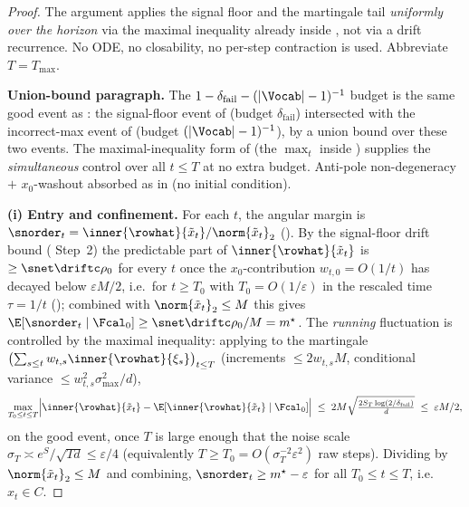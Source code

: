 \begin{proof}
The argument applies the signal floor and the martingale tail
\emph{uniformly over the horizon} via the maximal inequality already inside
, not via a drift recurrence. No ODE, no closability, no
per-step contraction is used. Abbreviate $T=T_{\max}$.

\smallskip\noindent\textbf{Union-bound paragraph.} The
$1-\delta_{\mathrm{fail}}-(|\Vocab|-1)^{-1}$ budget is the same good event
as : the signal-floor event of 
(budget $\delta_{\mathrm{fail}}$) intersected with the incorrect-max event
of  (budget $(|\Vocab|-1)^{-1}$), by a union bound
over these two events. The maximal-inequality form of  (the
$\max_t$ inside ) supplies the \emph{simultaneous}
control over all $t\le T$ at no extra budget. Anti-pole non-degeneracy
$+$ $x_0$-washout absorbed as in  (no initial condition).

\smallskip\noindent\textbf{(i) Entry and confinement.} For each $t$, the
angular margin is $\snorder_t=\inner{\rowhat}{\tilde x_t}/\norm{\tilde x_t}_2$
(). By the signal-floor drift
bound ( Step~2) the predictable part of
$\inner{\rowhat}{\tilde x_t}$ is $\ge\snet\driftc\rho_0$ for every $t$ once
the $x_0$-contribution $w_{t,0}=O(1/t)$ has decayed below $\varepsilon M/2$,
i.e.\ for $t\ge T_0$ with $T_0=O(1/\varepsilon)$ in the rescaled time
$\tau=1/t$ (); combined with $\norm{\tilde x_t}_2\le M$
this gives $\E[\snorder_t\mid\Fcal_0]\ge\snet\driftc\rho_0/M=m^\star$. The
\emph{running} fluctuation is controlled by the maximal inequality: applying
 to the martingale $\bigl(\sum_{s\le t}w_{t,s}\inner{\rowhat}{\xi_s}\bigr)_{t\le T}$
(increments $\le2w_{t,s}M$, conditional variance $\le w_{t,s}^2\sigma_{\max}^2/d$),
\begin{align*}
   \max_{T_0\le t\le T}\Bigl|\inner{\rowhat}{\tilde x_t}-\E[\inner{\rowhat}{\tilde x_t}\mid\Fcal_0]\Bigr|
   \;\le\; 2M\sqrt{\tfrac{2S_T\log(2/\delta_{\mathrm{fail}})}{d}}
   \;\le\; \varepsilon M/2,
\end{align*}
on the good event, once $T$ is large enough that the noise scale
$\sigma_T\asymp e^S/\sqrt{Td}\le\varepsilon/4$ (equivalently
$T\ge T_0=O(\sigma_T^{-2}\varepsilon^2)$ raw steps). Dividing by
$\norm{\tilde x_t}_2\le M$ and combining, $\snorder_t\ge m^\star-\varepsilon$
for all $T_0\le t\le T$, i.e.\ $x_t\in C$.


\end{proof}
